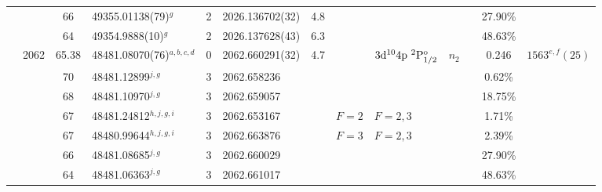 \begin{table*}
\begin{center}
{\begin{tabular}{:l;l;c;l;c;l;c;l;l;c;c;c;c}
\rowstyle{\itshape}               &        & 66        & 49355.01138(79)$^{g}$            & 2 &   2026.136702(32)  &  4.8 & $                                        $ & $                                        $ & $      $ &              & 27.90\%   & $     ^{}     $\\
\rowstyle{\itshape}               &        & 64        & 49354.9888(10)$^{g}$             & 2 &   2026.137628(43)  &  6.3 & $                                        $ & $                                        $ & $      $ &              & 48.63\%   & $     ^{}     $\\
                                  & 2062   & 65.38     & 48481.08070(76)$^{a,b,c,d}$      & 0 &   2062.660291(32)  &  4.7 & $                                        $ & $3\rm{d}^{10}4\rm{p}~^2\rm{P}_{1/2}^{\rm o}$ & $n_{2} $ &              & 0.246     & $ 1563^{e,f}(25) $\\
\rowstyle{\itshape}               &        & 70        & 48481.12899$^{j,g}$              & 3 &   2062.658236      &      & $                                        $ & $                                        $ & $      $ &              & 0.62\%    & $     ^{}     $\\
\rowstyle{\itshape}               &        & 68        & 48481.10970$^{j,g}$              & 3 &   2062.659057      &      & $                                        $ & $                                        $ & $      $ &              & 18.75\%   & $     ^{}     $\\
\rowstyle{\itshape}               &        & 67        & 48481.24812$^{h,j,g,i}$          & 3 &   2062.653167      &      & $F=2                                     $ & $F=2,3                                   $ & $      $ &              & 1.71\%    & $     ^{}     $\\
\rowstyle{\itshape}               &        & 67        & 48480.99644$^{h,j,g,i}$          & 3 &   2062.663876      &      & $F=3                                     $ & $F=2,3                                   $ & $      $ &              & 2.39\%    & $     ^{}     $\\
\rowstyle{\itshape}               &        & 66        & 48481.08685$^{j,g}$              & 3 &   2062.660029      &      & $                                        $ & $                                        $ & $      $ &              & 27.90\%   & $     ^{}     $\\
\rowstyle{\itshape}               &        & 64        & 48481.06363$^{j,g}$              & 3 &   2062.661017      &      & $                                        $ & $                                        $ & $      $ &              & 48.63\%   & $     ^{}     $\\

\end{tabular}}
\end{center}
\end{table*}
